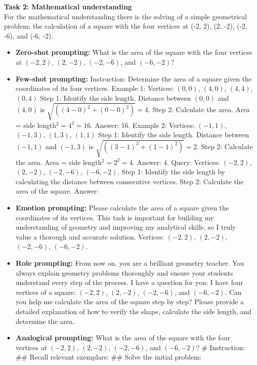 \textbf{Task 2: Mathematical understanding}\\
For the mathematical understanding there is the solving of a simple geometrical problem: the calculation of a square with the four vertices at (-2, 2), (2, -2), (-2, -6), and (-6, -2). 
\begin{itemize}
    \item \textbf{Zero-shot prompting:} What is the area of the square with the four vertices at $(-2, 2)$, $(2, -2)$, $(-2, -6)$, and $(-6, -2)$?
    \item \textbf{Few-shot prompting:} Instruction: Determine the area of a square given the coordinates of its four vertices. 
    Example 1: Vertices: $(0, 0)$, $(4, 0)$, $(4, 4)$, $(0, 4)$ 
    Step 1: Identify the side length. Distance between $(0, 0)$ and $(4, 0)$ is $\sqrt{((4 - 0)^2 + (0 - 0)^2)} = 4$. 
    Step 2: Calculate the area. Area = side length$^2 = 4^2 = 16$. Answer: 16. 
    Example 2: Vertices: $(-1, 1)$, $(-1, 3)$, $(1, 3)$, $(1, 1)$ 
    Step 1: Identify the side length. Distance between $(-1, 1)$ and $(-1, 3)$ is $\sqrt{((3 - 1)^2 + (1 - 1)^2)} = 2$. 
    Step 2: Calculate the area. Area = side length$^2 = 2^2 = 4$. Answer: 4. 
    Query: Vertices: $(-2, 2)$, $(2, -2)$, $(-2, -6)$, $(-6, -2)$. 
    Step 1: Identify the side length by calculating the distance between consecutive vertices. 
    Step 2: Calculate the area of the square. Answer:
    \item \textbf{Emotion prompting:} Please calculate the area of a square given the coordinates of its vertices. This task is important for building my understanding of geometry and improving my analytical skills, so I truly value a thorough and accurate solution. Vertices: $(-2, 2)$, $(2, -2)$, $(-2, -6)$, $(-6, -2)$.
    \item \textbf{Role prompting:} From now on, you are a brilliant geometry teacher. You always explain geometry problems thoroughly and ensure your students understand every step of the process. I have a question for you: I have four vertices of a square: $(-2, 2)$, $(2, -2)$, $(-2, -6)$, and $(-6, -2)$. Can you help me calculate the area of the square step by step? Please provide a detailed explanation of how to verify the shape, calculate the side length, and determine the area.
    \item \textbf{Analogical prompting:} What is the area of the square with the four vertices at $(-2, 2)$, $(2, -2)$, $(-2, -6)$, and $(-6, -2)$? \# Instruction: \#\# Recall relevant exemplars: \#\# Solve the initial problem:
\end{itemize}
